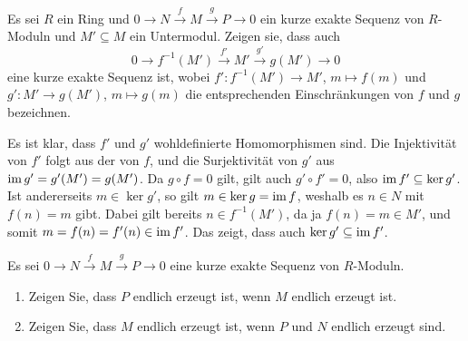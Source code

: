 \begin{question}[subtitle = Einschränkung kurzer exakter Sequenzen]
  \label{question: restriction of a short exact sequence to a submodule of its middle term}
  Es sei $R$ ein Ring und $0 \to N \xrightarrow{f} M \xrightarrow{g} P \to 0$ ein kurze exakte Sequenz von $R$-Moduln und $M' \subseteq M$ ein Untermodul.
  Zeigen sie, dass auch
  \[
    0 \to f^{-1}(M') \xrightarrow{f'} M' \xrightarrow{g'} g(M') \to 0
  \]
  eine kurze exakte Sequenz ist, wobei $f' \colon f^{-1}(M') \to M'$, $m \mapsto f(m)$ und $g' \colon M' \to g(M')$, $m \mapsto g(m)$ die entsprechenden Einschränkungen von $f$ und $g$ bezeichnen.
\end{question}


\begin{solution}
  Es ist klar, dass $f'$ und $g'$ wohldefinierte Homomorphismen sind.
  Die Injektivität von $f'$ folgt aus der von $f$, und die Surjektivität von $g'$ aus $\operatorname{im} g' = g'(M') = g(M')$.
  Da $g \circ f = 0$ gilt, gilt auch $g' \circ f' = 0$, also $\operatorname{im} f' \subseteq \ker g'$.
  Ist andererseits $m \in \ker g'$, so gilt $m \in \ker g = \operatorname{im} f$, weshalb es $n \in N$ mit $f(n) = m$ gibt.
  Dabei gilt bereits $n \in f^{-1}(M')$, da ja $f(n) = m \in M'$, und somit $m = f(n) = f'(n) \in \operatorname{im} f'$.
  Das zeigt, dass auch $\ker g' \subseteq \operatorname{im} f'$.
\end{solution}


\begin{question}[subtitle = Endlichkeit in kurzen exakten Sequenzen]
  \label{question: finitely generated in short exact sequences}
  Es sei $0 \to N \xrightarrow{f} M \xrightarrow{g} P \to 0$ eine kurze exakte Sequenz von $R$-Moduln.
  \begin{enumerate}
    \item
      Zeigen Sie, dass $P$ endlich erzeugt ist, wenn $M$ endlich erzeugt ist.
    \item
      Zeigen Sie, dass $M$ endlich erzeugt ist, wenn $P$ und $N$ endlich erzeugt sind.
  \end{enumerate}
\end{question}


